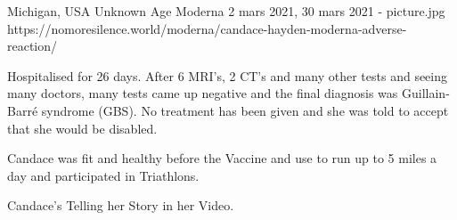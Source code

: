 {Michigan, USA}
{Unknown Age}
{Moderna}
{2 mars 2021, 30 mars 2021}
{-}
{picture.jpg}
{https://nomoresilence.world/moderna/candace-hayden-moderna-adverse-reaction/}
{

Hospitalised for 26 days. After 6 MRI’s, 2 CT’s and many other tests and seeing many doctors, many tests came up negative and the final diagnosis was Guillain-Barré syndrome (GBS). No treatment has been given and she was told to accept that she would be disabled.

Candace was fit and healthy before the Vaccine and use to run up to 5 miles a day and participated in Triathlons.

Candace’s Telling her Story in her Video.
}

